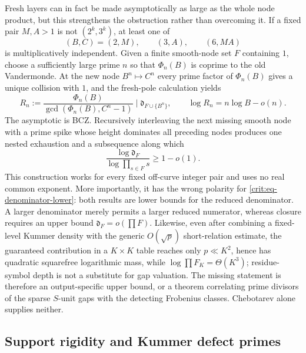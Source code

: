 \documentclass[11pt,oneside]{article}
\theoremstyle{definition}
\theoremstyle{remark}
\begin{document}
Fresh layers can in fact be made asymptotically as large as the whole node product, but this
strengthens the obstruction rather than overcoming it.  If a fixed pair $M,A>1$ is not
$(2^k,3^k)$, at least one of
\[
 (B,C)=(2,M),\qquad(3,A),\qquad(6,MA)
\]
is multiplicatively independent.  Given a finite smooth-node set $F$ containing $1$, choose
a sufficiently large prime $n$ so that $\Phi_n(B)$ is coprime to the old Vandermonde.  At the
new node $B^n\mapsto C^n$ every prime factor of $\Phi_n(B)$ gives a unique collision with
$1$, and the fresh-pole calculation yields
\begin{equation}
 R_n:=\frac{\Phi_n(B)}{\gcd(\Phi_n(B),C^n-1)}
 \mid \mathfrak d_{F\cup\{B^n\}},
 \qquad \log R_n=n\log B-o(n).
 \label{crit:eq-sparse-spike-divisor}
\end{equation}
The asymptotic is BCZ.  Recursively interleaving the next missing smooth node with a prime
spike whose height dominates all preceding nodes produces one nested exhaustion and a
subsequence along which
\begin{equation}
 \frac{\log\mathfrak d_F}{\log\prod_{s\in F}s}\ge1-o(1).
 \label{crit:eq-sparse-spike-scale}
\end{equation}
This construction works for every fixed off-curve integer pair and uses no real common
exponent.  More importantly, it has the wrong polarity for
\eqref{crit:eq-denominator-lower}: both results are lower bounds for the reduced denominator.
A larger denominator merely permits a larger reduced numerator, whereas closure requires an
upper bound $\mathfrak d_F=o(\prod F)$.  Likewise, even after combining a fixed-level
Kummer density with the generic $O(\sqrt p)$ short-relation estimate, the guaranteed
contribution in a $K\times K$ table reaches only $p\ll K^2$, hence has quadratic squarefree
logarithmic mass, while $\log\prod F_K=\Theta(K^3)$; residue-symbol depth is not a substitute
for gap valuation.
The missing statement is therefore an output-specific upper bound, or a theorem correlating
prime divisors of the sparse $S$-unit gaps with the detecting Frobenius classes.  Chebotarev
alone supplies neither.

\subsection{Support rigidity and Kummer defect primes}
\label{crit:support-defects}
\end{document}
